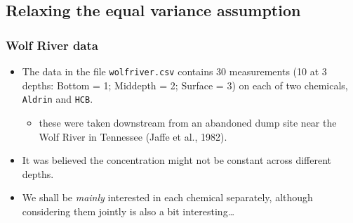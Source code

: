 \documentclass[a4paper]{article}\usepackage[]{graphicx}\usepackage[]{xcolor}
\begin{document}
\subsection{Relaxing the equal variance assumption}
\subsubsection{Wolf River data}
\begin{itemize}
	\item The data in the file \lstinline|wolfriver.csv| contains 30 measurements (10 at 3 depths: Bottom = 1; Middepth = 2; Surface = 3) on each of two chemicals, \lstinline|Aldrin| and \lstinline|HCB|.
	\begin{itemize}
		\item these were taken downstream from an abandoned dump site near the Wolf River in Tennessee (Jaffe et al., 1982).
	\end{itemize}
	\item It was believed the concentration might not be constant across different depths.
	\item We shall be \textit{mainly} interested in each chemical separately, although considering them jointly is also a bit interesting\dots
\end{itemize}
\end{document}
